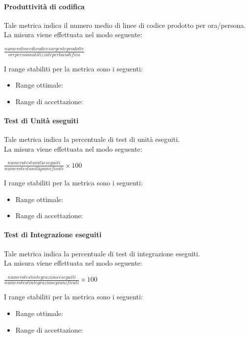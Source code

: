 			\paragraph{Produttività di codifica}
			Tale metrica indica il numero medio di linee di codice prodotto per ora/persona.
\\La misura viene effettuata nel modo seguente:
			\begin{center}
			$\frac{numero linee di codice sorgente prodotte}{ore persona utilizzate per la codifica}$
			\end{center}
I range stabiliti per la metrica sono i seguenti:
			\begin{itemize}
					\item Range ottimale:
					\item Range di accettazione:
				\end{itemize}
				
			\paragraph{Test di Unità eseguiti}
			Tale metrica indica la percentuale di test di unità eseguiti.
\\La misura viene effettuata nel modo seguente:
			\begin{center}
			$\frac{numero test unità eseguiti}{numero test unità pianificati}\times100$
			\end{center}
			I range stabiliti per la metrica sono i seguenti:
			\begin{itemize}
					\item Range ottimale:
					\item Range di accettazione:
				\end{itemize}
				
			\paragraph{Test di Integrazione eseguiti}
				Tale metrica indica la percentuale di test di integrazione eseguiti.
\\La misura viene effettuata nel modo seguente:
			\begin{center}
			$\frac{numero test integrazione eseguiti}{numero test integrazione pianificati}\times100$
			\end{center}
			I range stabiliti per la metrica sono i seguenti:
			\begin{itemize}
					\item Range ottimale:
					\item Range di accettazione:
				\end{itemize}
				
